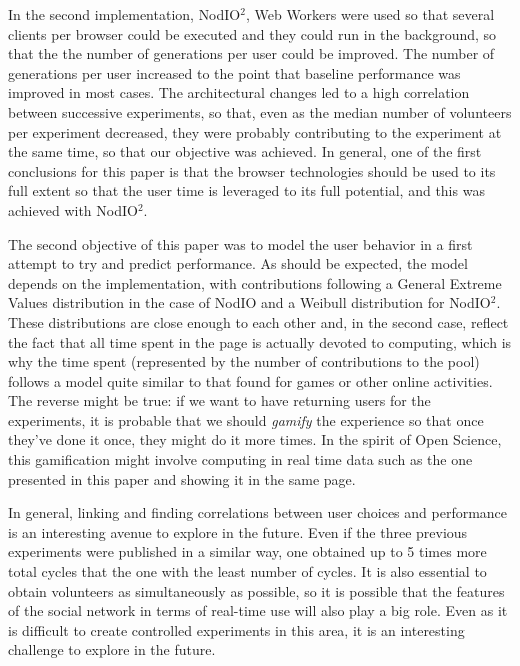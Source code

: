 \documentclass[journal,onecolumn]{IEEEtran}
\begin{document}
In the second implementation, {\sf NodIO$^2$}, Web Workers
were used so that several clients per browser could be executed and
they could run in the background, so that the the number of
generations per user could be improved. The number of generations per
user increased to the point that baseline performance was improved in
most cases. The architectural changes led to a high correlation
between successive experiments, so that, even as the median number of
volunteers per experiment decreased, they were probably contributing
to the experiment at the same time, so that our objective was
achieved. In general, one of the first conclusions for this paper is
that the browser technologies should be used to its full extent so
that the user time is leveraged to its full potential, and this was
achieved with {\sf NodIO$^2$}. 

The second objective of this paper was to model the user behavior in a
first attempt to try and predict performance. As should be expected,
the model depends on the implementation, with contributions following
a General Extreme Values distribution in the case of {\sf NodIO} and a
Weibull distribution for {\sf NodIO$^2$}. These distributions are
close enough to each other and, in the second case, reflect the fact
that all time spent in the page is actually devoted to computing,
which is why the time spent (represented by the number of
contributions to the pool) follows a model quite similar to that found
for games or other online activities. The reverse might be true: if we
want to have returning users for the experiments, it is probable that
we should {\em gamify} the experience so that once they've done it
once, they might do it more times. In the spirit of Open Science, this
gamification might involve computing in real time data such as the one
presented in this paper and showing it in the same page. 

In general, linking and finding correlations between user choices and
performance is an interesting avenue to explore in the future. Even if
the three previous experiments were published in a similar way, one
obtained up to 5 times more total cycles  that the one with the least
number of cycles. It is also essential to obtain volunteers as
simultaneously as possible, so it is possible that the features of the
social network in terms of real-time use will also play a big
role. Even as it is difficult to create controlled experiments in this
area, it is an interesting challenge to explore in the future.
\end{document}

